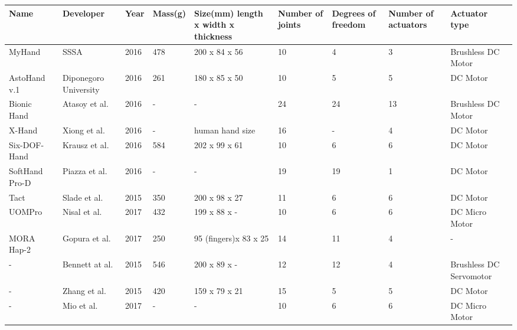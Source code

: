 \documentclass[a4paper, 10pt, conference]{ieeeconf}      %
\begin{document}
\hspace*{-1cm}
\begin{tabular}{l|p{2cm}|p{1cm}|p{1.2cm}|p{2.2cm}|p{1.2cm}|p{1.2cm}|p{1.2cm}|p{2cm}}

Name & Developer & Year & Mass(g) & Size(mm) length x width x thickness & Number of joints & Degrees of freedom & Number of \newline actuators & Actuator type\\
\hline
MyHand~\cite{myhand} & SSSA & 2016 & 478 & 200 x 84 x 56 & 10 & 4 & 3 & Brushless DC Motor\\
\hline
AstoHand v.1~\cite{astohand} & Diponegoro University & 2016 & 261 & 180 x 85 x 50 & 10 & 5 & 5 & DC Motor\\
\hline
Bionic Hand~\cite{bionichand} & Atasoy et al. & 2016 & - & - & 24 & 24 & 13 & Brushless DC Motor\\
\hline
X-Hand~\cite{xhand}& Xiong et al. & 2016 & - & human hand size & 16 & - & 4 & DC Motor\\
\hline
Six-DOF-Hand~\cite{6dofhand} & Krausz et al. & 2016 & 584 & 202 x 99 x 61 & 10 & 6 & 6 & DC Motor\\
\hline
SoftHand Pro-D~\cite{softhand} & Piazza et al. & 2016 & - & - & 19 & 19 & 1 & DC Motor\\
\hline
Tact~\cite{tact} & Slade et al. & 2015 & 350 & 200 x 98 x 27 & 11 & 6 & 6 & DC Motor\\
\hline
UOMPro~\cite{uompro} & Nisal et al. & 2017 & 432 & 199 x 88 x - & 10 & 6 & 6 & DC Micro Motor\\
\hline
MORA Hap-2~\cite{morahap2} & Gopura et al. & 2017 & 250 & 95 (fingers)\newline x 83 x 25 & 14 & 11 & 4 & -\\
\hline
-~\cite{bennett} & Bennett at al. & 2015 & 546 & 200 x 89 x - & 12 & 12 & 4 & Brushless DC Servomotor\\
\hline
-~\cite{zhang} & Zhang et al. & 2015 & 420 & 159 x 79 x 21 & 15 & 5 & 5 & DC Motor\\
\hline
-~\cite{mio} & Mio et al. & 2017 & - & - & 10 & 6 & 6 & DC Micro Motor\\



\end{tabular}

\vspace{3cm}
\end{document}
